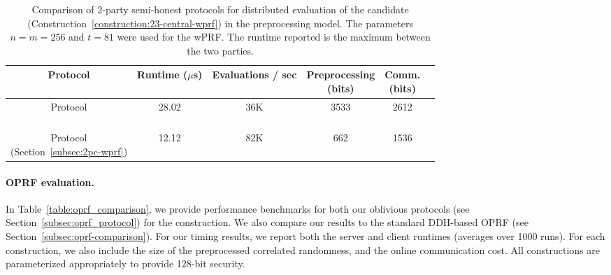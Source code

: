 
\begin{table}[t]
{
\centering
\begin{tabular}{|c|c|c|c|c|c|}
	\hline
	Protocol & Runtime ($\mu$s) & Evaluations / sec & \makecell{Preprocessing \\ (bits)} & \makecell{Comm. \\ (bits)} \\
	\hline
	\hline
	\makecell{\ttwPRF Protocol \\~\cite{boneh2018-darkmatter}} & 28.02 & 36K & 3533 & 2612 \\
	\hline
	\makecell{\ttwPRF Protocol \\ (Section~\ref{subsec:2pc-wprf})} & 12.12 & 82K & 662 & 1536 \\
	\hline	
\end{tabular}
		
\caption{Comparison of 2-party semi-honest protocols for distributed evaluation of the \ttwPRF candidate (Construction~\ref{construction:23-central-wprf}) in the preprocessing model. The parameters $n=m=256$ and $t=81$ were used for the wPRF. The runtime reported is the maximum between the two parties.}
\label{table:distributed_wprf}
}
\end{table}

\paragraph{OPRF evaluation.}
In Table~\ref{table:oprf_comparison}, we provide performance benchmarks for both our oblivious protocols (see Section~\ref{subsec:oprf_protocol}) for the \ttwPRF construction. We also compare our results to the standard DDH-based OPRF (see Section~\ref{subsec:oprf-comparison}). For our timing results, we report both the server and client runtimes (averages over 1000 runs). For each construction, we also include the size of the preprocessed correlated randomness, and the online communication cost. All constructions are parameterized appropriately to provide 128-bit security.


